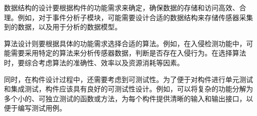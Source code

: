 数据结构的设计要根据构件的功能需求来确定，确保数据的存储和访问高效、合理。例如，对于事件分析子模块，可能需要设计合适的数据结构来存储传感器采集到的数据，以及用于分析的数据模型。

算法设计则要根据具体的功能需求选择合适的算法。例如，在入侵检测功能中，可能需要采用特定的算法来分析传感器数据，判断是否存在入侵行为。在选择算法时，要综合考虑算法的准确性、效率以及资源消耗等因素。

同时，在构件设计过程中，还需要考虑到可测试性。为了便于对构件进行单元测试和集成测试，构件应该具有良好的可测试性设计。例如，可以将复杂的功能分解为多个小的、可独立测试的函数或方法，为每个构件提供清晰的输入和输出接口，以便于编写测试用例。